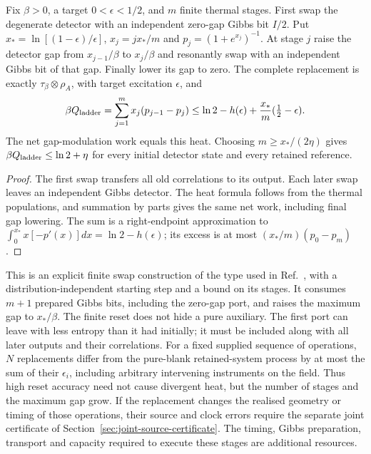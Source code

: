 \begin{proposition}
\label{prop:thermal-reset-ladder}
Fix $\beta>0$, a target $0<\epsilon<1/2$, and $m$ finite thermal stages.
First swap the degenerate detector with an independent zero-gap Gibbs bit
$I/2$. Put $x_*=\ln[(1-\epsilon)/\epsilon]$,
$x_j=jx_*/m$ and $p_j=(1+e^{x_j})^{-1}$.
At stage $j$ raise the detector gap from $x_{j-1}/\beta$ to $x_j/\beta$
and resonantly swap with an independent Gibbs bit of that gap.
Finally lower its gap to zero. The complete replacement is exactly
$\tau_\beta\otimes\rho_A$, with target excitation $\epsilon$, and
\begin{equation}\label{eq:thermal-ladder-heat}
 \beta Q_{\rm ladder}
 =\sum_{j=1}^m x_j(p_{j-1}-p_j)
 \le\ln2-h(\epsilon)+\frac{x_*}{m}(\tfrac12-\epsilon).
\end{equation}
The net gap-modulation work equals this heat.
Choosing $m\ge x_*/(2\eta)$ gives $\beta Q_{\rm ladder}\le\ln2+\eta$
for every initial detector state and every retained reference.
\end{proposition}
\begin{proof}
The first swap transfers all old correlations to its output.
Each later swap leaves an independent Gibbs detector.
The heat formula follows from the thermal populations, and summation by
parts gives the same net work, including final gap lowering.
The sum is a right-endpoint approximation to
$\int_0^{x_*}x[-p'(x)]dx=\ln2-h(\epsilon)$;
its excess is at most $(x_*/m)(p_0-p_m)$.
\end{proof}
This is an explicit finite swap construction of the type used in
Ref.~\cite[Sec.~6]{ReebWolf2014}, with a distribution-independent starting
step and a bound on its stages. It consumes $m+1$ prepared Gibbs bits,
including the zero-gap port, and raises the maximum gap to $x_*/\beta$.
The finite reset does not hide a pure auxiliary. The first port can leave
with less entropy than it had initially; it must be included along with all
later outputs and their correlations. For a fixed supplied sequence of
operations, $N$ replacements differ from the pure-blank retained-system
process by at most the sum of their $\epsilon_i$, including arbitrary
intervening instruments on the field. Thus high reset accuracy need not
cause divergent heat, but the number of stages and the maximum gap grow.
If the replacement changes the realised geometry or timing of those
operations, their source and clock errors require the separate joint
certificate of Section~\ref{sec:joint-source-certificate}.
The timing, Gibbs preparation, transport and capacity required to execute
these stages are additional resources.


